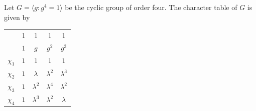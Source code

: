\begin{example}
	Let $G=\langle g:g^4=1\rangle$ 
	be the cyclic group of order four. The character table of $G$ is given by
	\begin{center}
		\begin{tabular}{|c|cccc|}
			\hline 
			& 1 & 1 & 1 & 1\tabularnewline
			& $1$ & $g$ & $g^2$ & $g^{3}$\tabularnewline
			\hline 
			$\chi_{1}$ & $1$ & $1$ & $1$ & $1$\tabularnewline
			$\chi_{2}$ & $1$ & $\lambda$ & $\lambda^2$ & $\lambda^{3}$\tabularnewline
			$\chi_{3}$ & $1$ & $\lambda^2$ & $\lambda^4$ & $\lambda^{2}$\tabularnewline
			$\chi_{4}$ & $1$ & $\lambda^{3}$ & $\lambda^{2}$ & $\lambda$\tabularnewline
			\hline
		\end{tabular}
	\end{center}




\end{example}

